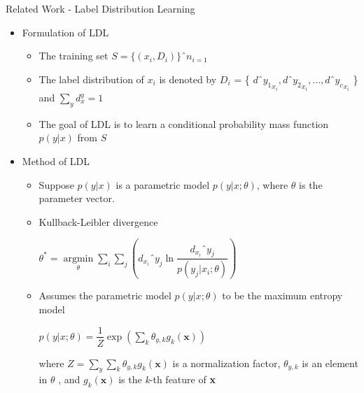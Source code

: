 \documentclass[
 size=14pt,
 paper=smartboard,  %
 mode=present, 		%
 display=slides, 	%
 style=tuliplab,  	%
 pauseslide,
 fleqn,leqno]{powerdot}
\begin{document}
\begin{slide}{Related Work - Label Distribution Learning}

\begin{itemize}
	\item 
	Formulation of LDL
	
	\begin{itemize}
		\item 
		The training set $ S = \{ ( x_{i} , D_{i} )  \} ˆn_{ i = 1 } $
		\item 
		The label distribution of $ x_{i}  $ is denoted by 
	    $ D_{i} $ = \{ 
	    	$ d ˆ {y_{1}} _{ x_{i} } , 
	    	d ˆ {y_{2}} _{ x_{i} } ,...,
	    	d ˆ {y_{c}} _{ x_{i} }  $ \}
		and 
		$ \sum_{y}  d^y_{x} = 1 $
		\item 
		The goal of LDL is to 
		learn a conditional probability mass function 
		$ p(y|x) $ from $ S $
	\end{itemize}
	
	\item 
	Method of LDL
	
	\begin{itemize}
		\item 
		Suppose $ p(y|x) $  is a parametric model
		 $ p(y|x;{\theta}) $, 
		 where $ \theta $ is the parameter vector. 
		\item 
		Kullback-Leibler divergence	
		
		$ \theta ^{\ast} = 
		 \mathop{\arg\min}\limits_{\theta}
		 \sum\limits_{i}
		 \sum\limits_{j}
		 ( d_{ x_{ i } } ˆ{ y_{ j } }
		 \ln \dfrac{ d_{ x_{ i } } ˆ{ y_{ j } } }{ p( y_{ j } | x_{ i } ;{\theta}) }
		 )$	
		\item 
		Assumes the parametric model 
		$ p(y|x;{\theta}) $ 
		to be the maximum entropy model	
		
		$ p(y|x;{\theta}) = \dfrac{1}{Z}
		\exp ( \sum\limits_{k}
		{\theta}_{y,k} 
		g_{k}( \textbf{x})  ) $ 
		
		where $ Z = \sum _{y}
		\sum_{k}  {\theta}_{y,k}  g_{k}( \textbf{x}) $
		is a normalization factor,
		$ {\theta}_{y,k} $ is an element in \textbf {$\theta$} ,
		and $ g_{k}( \textbf{x}) $ is the \textit{k}-th feature of \textbf{ x }
	\end{itemize}

\end{itemize}

\end{slide}
\end{document}
